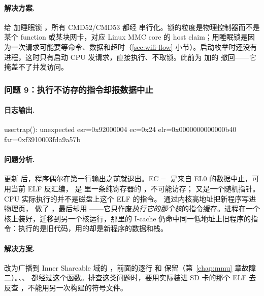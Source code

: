 \paragraph{解决方案.} 给  加睡眠锁 ，所有 CMD52/CMD53 都经  串行化。锁的粒度是物理控制器而不是某个 function 或某块网卡，对应 Linux MMC core 的 host claim；用睡眠锁是因为一次请求可能要等命令、数据和超时（\ref{sec:wifi-flow} 小节）。启动枚举时还没有进程，这时只有启动 CPU 发请求，直接执行、不取锁。此前为  加的  撤回——它掩盖不了并发访问。

\subsubsection{问题 9：执行不访存的指令却报数据中止}

\paragraph{日志输出.}
\begin{txtcode}
usertrap(): unexpected esr=0x92000004 ec=0x24
            elr=0x0000000000000b40 far=0xf3910003fda9a57b
\end{txtcode}

\paragraph{问题分析.} 更新  后，程序偶尔在第一行输出之前就退出。EC$=$ 是来自 EL0 的数据中止，可用当前 ELF 反汇编， 是  里一条纯寄存器的 ，不可能访存； 又是一个随机指针。CPU 实际执行的并不是磁盘上这个 ELF 的指令。 通过内核高地址把新程序写进物理页， 做了 ，最后却用 ——它只作废\emph{执行它的那个核}的指令缓存。进程在一个核上装好，迁移到另一个核运行，那里的 I-cache 仍命中同一低地址上旧程序的指令：执行的是旧代码，用的却是新程序的数据和栈。

\paragraph{解决方案.} 改为广播到 Inner Shareable 域的 ，前面的逐行  和  保留（第~\ref{chap:mmu} 章故障二）。、、 都经过这个函数。排查这类问题时，要用实际装进 SD 卡的那个 ELF 去反查 ，不能用另一次构建的符号文件。

